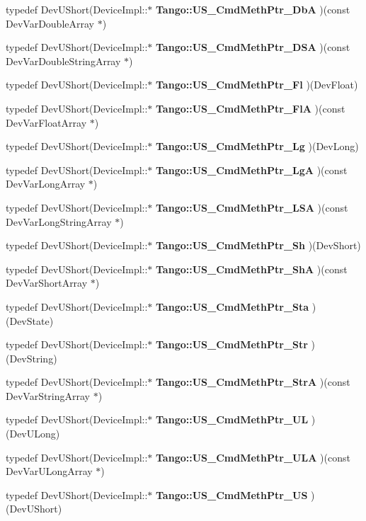 \begin{DoxyCompactItemize}
typedef Dev\-U\-Short(Device\-Impl\-::$\ast$ {\bf Tango\-::\-U\-S\-\_\-\-Cmd\-Meth\-Ptr\-\_\-\-Db\-A} )(const Dev\-Var\-Double\-Array $\ast$)
\item 
typedef Dev\-U\-Short(Device\-Impl\-::$\ast$ {\bf Tango\-::\-U\-S\-\_\-\-Cmd\-Meth\-Ptr\-\_\-\-D\-S\-A} )(const Dev\-Var\-Double\-String\-Array $\ast$)
\item 
typedef Dev\-U\-Short(Device\-Impl\-::$\ast$ {\bf Tango\-::\-U\-S\-\_\-\-Cmd\-Meth\-Ptr\-\_\-\-Fl} )(Dev\-Float)
\item 
typedef Dev\-U\-Short(Device\-Impl\-::$\ast$ {\bf Tango\-::\-U\-S\-\_\-\-Cmd\-Meth\-Ptr\-\_\-\-Fl\-A} )(const Dev\-Var\-Float\-Array $\ast$)
\item 
typedef Dev\-U\-Short(Device\-Impl\-::$\ast$ {\bf Tango\-::\-U\-S\-\_\-\-Cmd\-Meth\-Ptr\-\_\-\-Lg} )(Dev\-Long)
\item 
typedef Dev\-U\-Short(Device\-Impl\-::$\ast$ {\bf Tango\-::\-U\-S\-\_\-\-Cmd\-Meth\-Ptr\-\_\-\-Lg\-A} )(const Dev\-Var\-Long\-Array $\ast$)
\item 
typedef Dev\-U\-Short(Device\-Impl\-::$\ast$ {\bf Tango\-::\-U\-S\-\_\-\-Cmd\-Meth\-Ptr\-\_\-\-L\-S\-A} )(const Dev\-Var\-Long\-String\-Array $\ast$)
\item 
typedef Dev\-U\-Short(Device\-Impl\-::$\ast$ {\bf Tango\-::\-U\-S\-\_\-\-Cmd\-Meth\-Ptr\-\_\-\-Sh} )(Dev\-Short)
\item 
typedef Dev\-U\-Short(Device\-Impl\-::$\ast$ {\bf Tango\-::\-U\-S\-\_\-\-Cmd\-Meth\-Ptr\-\_\-\-Sh\-A} )(const Dev\-Var\-Short\-Array $\ast$)
\item 
typedef Dev\-U\-Short(Device\-Impl\-::$\ast$ {\bf Tango\-::\-U\-S\-\_\-\-Cmd\-Meth\-Ptr\-\_\-\-Sta} )(Dev\-State)
\item 
typedef Dev\-U\-Short(Device\-Impl\-::$\ast$ {\bf Tango\-::\-U\-S\-\_\-\-Cmd\-Meth\-Ptr\-\_\-\-Str} )(Dev\-String)
\item 
typedef Dev\-U\-Short(Device\-Impl\-::$\ast$ {\bf Tango\-::\-U\-S\-\_\-\-Cmd\-Meth\-Ptr\-\_\-\-Str\-A} )(const Dev\-Var\-String\-Array $\ast$)
\item 
typedef Dev\-U\-Short(Device\-Impl\-::$\ast$ {\bf Tango\-::\-U\-S\-\_\-\-Cmd\-Meth\-Ptr\-\_\-\-U\-L} )(Dev\-U\-Long)
\item 
typedef Dev\-U\-Short(Device\-Impl\-::$\ast$ {\bf Tango\-::\-U\-S\-\_\-\-Cmd\-Meth\-Ptr\-\_\-\-U\-L\-A} )(const Dev\-Var\-U\-Long\-Array $\ast$)
\item 
typedef Dev\-U\-Short(Device\-Impl\-::$\ast$ {\bf Tango\-::\-U\-S\-\_\-\-Cmd\-Meth\-Ptr\-\_\-\-U\-S} )(Dev\-U\-Short)

\end{DoxyCompactItemize}
